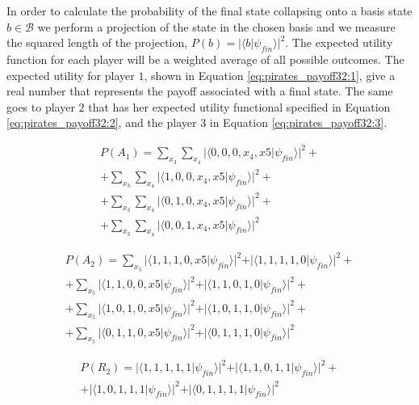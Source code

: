 \documentclass[10pt]{llncs}
\begin{document}
In order to calculate the probability of the final state collapsing onto a basis state $b \in \mathcal{B}$ we perform a projection of the state in the chosen basis and we measure the squared length of the projection, $P(b) = \vert\langle b\vert\psi_{fin}\rangle\vert^{2}$\cite{Trueblood}. The expected utility function for each player will be a weighted average of all possible outcomes. The expected utility for player $1$, shown in Equation \eqref{eq:pirates_payoff32:1}, give a real number that represents the payoff associated with a final state. The same goes to player $2$ that has her expected utility functional specified in Equation \eqref{eq:pirates_payoff32:2}, and the player $3$ in Equation \eqref{eq:pirates_payoff32:3}.


\begin{equation}
\begin{split}
P(A_{1}) = \sum_{x_{3}}\sum_{x_{4}}\vert\langle0,0,0,x_{4},x{5}\vert\psi_{fin}\rangle\vert^{2} + \\  + \sum_{x_{3}}\sum_{x_{4}}\vert\langle1,0,0,x_{4},x{5}\vert\psi_{fin}\rangle\vert^{2} + \\ 
+ \sum_{x_{3}}\sum_{x_{4}}\vert\langle0,1,0,x_{4},x{5}\vert\psi_{fin}\rangle\vert^{2} + \\ 
+ \sum_{x_{3}}\sum_{x_{4}}\vert\langle0,0,1,x_{4},x{5}\vert\psi_{fin}\rangle\vert^{2}
\end{split}
\end{equation}

\begin{equation}
\begin{split}
P(A_{2}) = \sum_{x_{5}}\vert\langle1,1,1,0,x{5}\vert\psi_{fin}\rangle\vert^{2} + \vert\langle1,1,1,1,0\vert\psi_{fin}\rangle\vert^{2} + \\ + \sum_{x_{5}}\vert\langle1,1,0,0,x{5}\vert\psi_{fin}\rangle\vert^{2}+ \vert\langle1,1,0,1,0\vert\psi_{fin}\rangle\vert^{2} + \\ 
+ \sum_{x_{5}}\vert\langle1,0,1,0,x{5}\vert\psi_{fin}\rangle\vert^{2} + \vert\langle1,0,1,1,0\vert\psi_{fin}\rangle\vert^{2}
+ \\ + \sum_{x_{5}}\vert\langle0,1,1,0,x{5}\vert\psi_{fin}\rangle\vert^{2} + \vert\langle0,1,1,1,0\vert\psi_{fin}\rangle\vert^{2}
\end{split}
\end{equation}

\begin{equation}
\begin{split}
P(R_{2}) = \vert\langle1,1,1,1,1\vert\psi_{fin}\rangle\vert^{2} + \vert\langle1,1,0,1,1\vert\psi_{fin}\rangle\vert^{2} + \\ 
+ \vert\langle1,0,1,1,1\vert\psi_{fin}\rangle\vert^{2}
+ \vert\langle0,1,1,1,1\vert\psi_{fin}\rangle\vert^{2}
 \end{split}
\end{equation}
\end{document}
